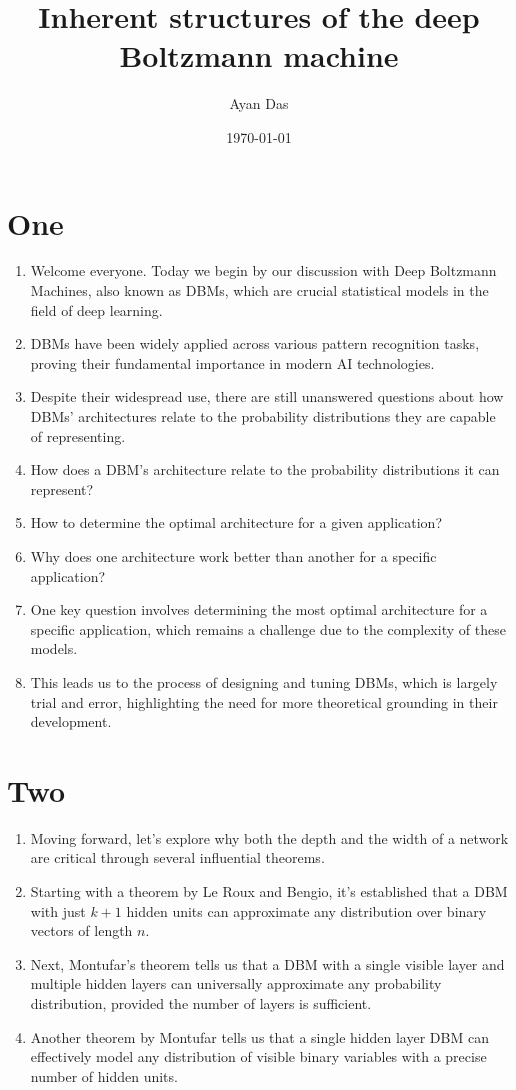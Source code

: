 \documentclass{article}
\title{Inherent structures of the deep Boltzmann machine}
\date{\today}
\author{Ayan Das}
\begin{document}
\maketitle
\section*{One}
\begin{enumerate}
    \item Welcome everyone. Today we begin by our discussion with Deep Boltzmann Machines, also known as DBMs, which are crucial statistical models in the field of deep learning.
    \item DBMs have been widely applied across various pattern recognition tasks, proving their fundamental importance in modern AI technologies.
    \item Despite their widespread use, there are still unanswered questions about how DBMs' architectures relate to the probability distributions they are capable of representing.
    \item How does a DBM's architecture relate to the probability distributions it can represent?
    \item How to determine the optimal architecture for a given application?
    \item Why does one architecture work better than another for a specific application?
    \item One key question involves determining the most optimal architecture for a specific application, which remains a challenge due to the complexity of these models.
    \item This leads us to the process of designing and tuning DBMs, which is largely trial and error, highlighting the need for more theoretical grounding in their development.
\end{enumerate}

\section*{Two}
\begin{enumerate}
    \item Moving forward, let's explore why both the depth and the width of a network are critical through several influential theorems.
    \item Starting with a theorem by Le Roux and Bengio, it's established that a DBM with just \(k+1\) hidden units can approximate any distribution over binary vectors of length \(n\).
    \item Next, Montufar's theorem tells us that a DBM with a single visible layer and multiple hidden layers can universally approximate any probability distribution, provided the number of layers is sufficient.
    \item Another theorem by Montufar tells us that a single hidden layer DBM can effectively model any distribution of visible binary variables with a precise number of hidden units.
\end{enumerate}
\end{document}
